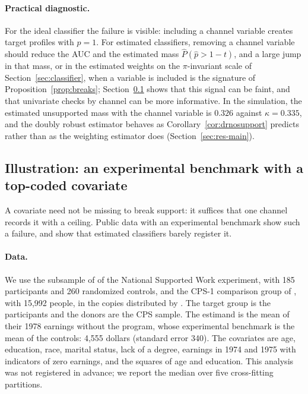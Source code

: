 \documentclass[11pt,a4paper]{article}
\theoremstyle{plain}
\theoremstyle{definition}
\begin{document}
\paragraph{Practical diagnostic.} For the ideal classifier the failure is visible: including a channel variable creates target profiles with $p=1$. For estimated classifiers, removing a channel variable should reduce the AUC and the estimated mass $\hat P(\hat p>1-t)$, and a large jump in that mass, or in the estimated weights on the $\pi$-invariant scale of Section~\ref{sec:classifier}, when a variable is included is the signature of Proposition~\ref{prop:breaks}; Section~\ref{sec:lalonde} shows that this signal can be faint, and that univariate checks by channel can be more informative. In the simulation, the estimated unsupported mass with the channel variable is $0.326$ against $\kappa=0.335$, and the doubly robust estimator behaves as Corollary~\ref{cor:drnosupport} predicts rather than as the weighting estimator does (Section~\ref{sec:res-main}).

\subsection{Illustration: an experimental benchmark with a top-coded covariate}\label{sec:lalonde}

A covariate need not be missing to break support: it suffices that one channel records it with a ceiling. Public data with an experimental benchmark show such a failure, and show that estimated classifiers barely register it.

\paragraph{Data.} We use the subsample of \citet{dehejia1999} of the National Supported Work experiment, with 185 participants and 260 randomized controls, and the CPS-1 comparison group of \citet{lalonde1986}, with 15{,}992 people, in the copies distributed by \citet{cunningham2021}. The target group is the participants and the donors are the CPS sample. The estimand is the mean of their 1978 earnings without the program, whose experimental benchmark is the mean of the controls: 4{,}555 dollars (standard error 340). The covariates are age, education, race, marital status, lack of a degree, earnings in 1974 and 1975 with indicators of zero earnings, and the squares of age and education. This analysis was not registered in advance; we report the median over five cross-fitting partitions.
\end{document}
